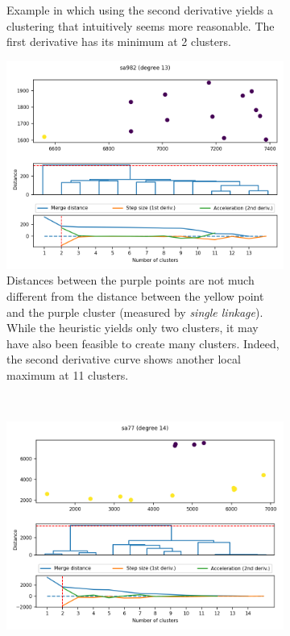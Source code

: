 \documentclass[
	fontsize=10pt, %
	twoside=false, %
	secnumdepth=1, %
  toc=indentunnumbered %
]{kaobook}
\begin{document}
\begin{figure}[h]
\begin{subfigure}{0.48\linewidth}
    \caption{Example in which using the second derivative yields a clustering
      that intuitively seems more reasonable. The first derivative has its
      minimum
      at 2 clusters. 
    }
  \end{subfigure}
  \linebreak
      \begin{subfigure}{0.48\linewidth}
        \includegraphics[width=\textwidth]{dendrograms/sa982.png}
        \caption{
          Distances between the purple points are not much
          different from the distance between the yellow point and the purple
          cluster (measured by \textit{single linkage}). While the heuristic yields
          only two clusters, it may have also been feasible to create many clusters.
          Indeed, the second derivative curve shows another local maximum at 11 clusters.
        }
      \end{subfigure}
      ~~~
      \begin{subfigure}{0.48\linewidth}
        \includegraphics[width=\textwidth]{dendrograms/sa77-variance.png}

\end{subfigure}
\end{figure}
\end{document}
